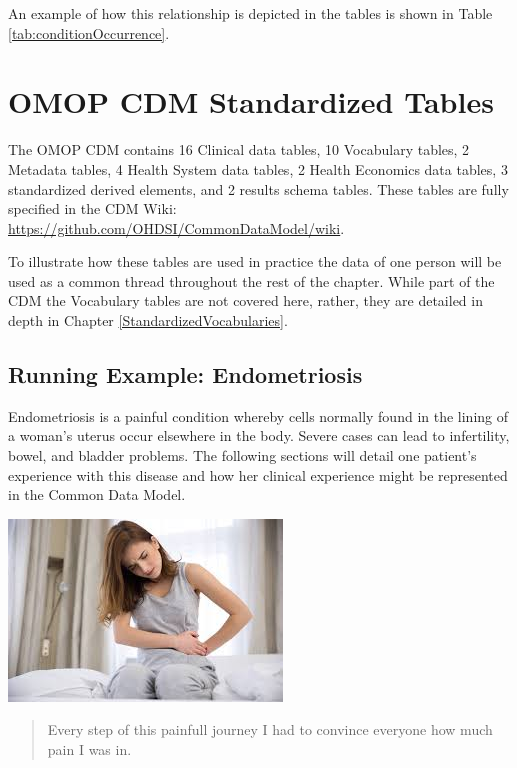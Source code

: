 \documentclass[]{book}
\begin{document}
An example of how this relationship is depicted in the tables is shown
in Table \ref{tab:conditionOccurrence}.

\section{OMOP CDM Standardized
Tables}\label{omop-cdm-standardized-tables}

The OMOP CDM contains 16 Clinical data tables, 10 Vocabulary tables, 2
Metadata tables, 4 Health System data tables, 2 Health Economics data
tables, 3 standardized derived elements, and 2 results schema tables.
These tables are fully specified in the CDM Wiki:
\url{https://github.com/OHDSI/CommonDataModel/wiki}.

To illustrate how these tables are used in practice the data of one
person will be used as a common thread throughout the rest of the
chapter. While part of the CDM the Vocabulary tables are not covered
here, rather, they are detailed in depth in Chapter
\ref{StandardizedVocabularies}.

\subsection{Running Example:
Endometriosis}\label{running-example-endometriosis}

Endometriosis is a painful condition whereby cells normally found in the
lining of a woman's uterus occur elsewhere in the body. Severe cases can
lead to infertility, bowel, and bladder problems. The following sections
will detail one patient's experience with this disease and how her
clinical experience might be represented in the Common Data Model.

\begin{center}\includegraphics[width=0.5\linewidth]{images/CommonDataModel/Lauren} \end{center}

\begin{quote}
Every step of this painfull journey I had to convince everyone how much
pain I was in.
\end{quote}
\end{document}
